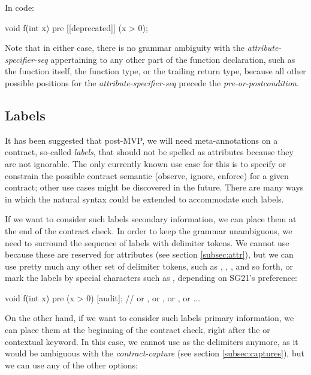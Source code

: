 In code:

\begin{codeblock}
void f(int x)
  pre [[deprecated]] (x > 0);
\end{codeblock}

Note that in either case, there is no grammar ambiguity with the \emph{attribute-specifier-seq} appertaining to any other part of the function declaration, such as the function itself, the function type, or the trailing return type, because all other possible positions for the \emph{attribute-specifier-seq} precede the \emph{pre-or-postcondition}.


\subsection{Labels}
\label{subsec:labels}

It has been suggested that post-MVP, we will need meta-annotations on a contract, so-called \emph{labels}, that should not be spelled as attributes because they are not ignorable. The only currently known use case for this is to specify or constrain the possible contract semantic (observe, ignore, enforce) for a given contract; other use cases might be discovered in the future. There are many ways in which the natural syntax could be extended to accommodate such labels.

If we want to consider such labels secondary information, we can place them at the end of the contract check. In order to keep the grammar unambiguous, we need to surround the sequence of labels with delimiter tokens. We cannot use \tcode{[[ ... ]]} because these are reserved for attributes (see section \ref{subsec:attr}), but we can use pretty much any other set of delimiter tokens, such as \mbox{\tcode{[ ...]}}, \mbox{}, \mbox{}, and so forth, or mark the labels by special characters such as , depending on SG21's preference:

\begin{codeblock}
void f(int x)
  pre (x > 0) [audit];   // or , or , or \tcode{[\{audit\}]}, or  ...
\end{codeblock}

On the other hand, if we want to consider such labels primary information, we can place them at the beginning of the contract check, right after the  or  contextual keyword. In this case, we cannot use \mbox{\tcode{[...]}} as the delimiters anymore, as it would be ambiguous with the \emph{contract-capture} (see section \ref{subsec:captures}), but we can use any of the other options:

